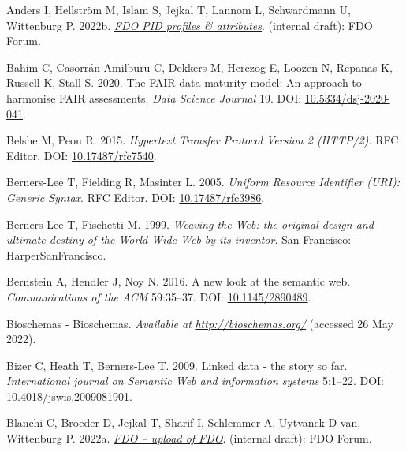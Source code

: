 \begin{CSLReferences}{1}{0}
\leavevmode{}%
Anders I, Hellström M, Islam S, Jejkal T, Lannom L, Schwardmann U, Wittenburg P. 2022b. \emph{\href{https://docs.google.com/document/d/1c2mZziq5pIPmLxMHLcYqlWrjYsc2ezGMXvp0E46iljo/edit}{FDO PID profiles \& attributes}}. (internal draft): FDO Forum.

\leavevmode{}%
Bahim C, Casorrán-Amilburu C, Dekkers M, Herczog E, Loozen N, Repanas K, Russell K, Stall S. 2020. The FAIR data maturity model: An approach to harmonise FAIR assessments. \emph{Data Science Journal} 19. DOI: \href{https://doi.org/10.5334/dsj-2020-041}{10.5334/dsj-2020-041}.

\leavevmode{}%
Belshe M, Peon R. 2015. \emph{Hypertext Transfer Protocol Version 2 (HTTP/2)}. RFC Editor. DOI: \href{https://doi.org/10.17487/rfc7540}{10.17487/rfc7540}.

\leavevmode{}%
Berners-Lee T, Fielding R, Masinter L. 2005. \emph{Uniform Resource Identifier (URI): Generic Syntax}. RFC Editor. DOI: \href{https://doi.org/10.17487/rfc3986}{10.17487/rfc3986}.

\leavevmode{}%
Berners-Lee T, Fischetti M. 1999. \emph{Weaving the Web: the original design and ultimate destiny of the World Wide Web by its inventor}. San Francisco: HarperSanFrancisco.

\leavevmode{}%
Bernstein A, Hendler J, Noy N. 2016. A new look at the semantic web. \emph{Communications of the ACM} 59:35--37. DOI: \href{https://doi.org/10.1145/2890489}{10.1145/2890489}.

\leavevmode{}%
Bioschemas - Bioschemas. \emph{Available at} \href{http://bioschemas.org/}{\emph{http://bioschemas.org/}} (accessed 26 May 2022).

\leavevmode{}%
Bizer C, Heath T, Berners-Lee T. 2009. Linked data - the story so far. \emph{International journal on Semantic Web and information systems} 5:1--22. DOI: \href{https://doi.org/10.4018/jswis.2009081901}{10.4018/jswis.2009081901}.

\leavevmode{}%
Blanchi C, Broeder D, Jejkal T, Sharif I, Schlemmer A, Uytvanck D van, Wittenburg P. 2022a. \emph{\href{https://docs.google.com/document/d/1fDR5VHbVIa2AbLsBR58idrfn_Ib3x6Fk-_LJ4c_Ftt4/edit}{FDO -- upload of FDO}}. (internal draft): FDO Forum.


\end{CSLReferences}
